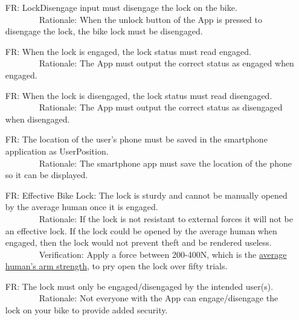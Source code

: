 \documentclass[12pt]{article}
\newcounter{reqnum} %
\begin{document}
\begin{itemize}
\setlength{\itemindent}{.5in}
\item[FR\refstepcounter{reqnum}\thereqnum\label{FRDisengage}:] LockDisengage input must disengage the lock on the bike.
\\ \-\ \-\ \-\ \-\ \-\ \-\ \-\ \-\ Rationale: When the unlock button of the App is pressed to disengage the lock, the bike lock must be disengaged.
\item[FR\refstepcounter{reqnum}\thereqnum\label{FRLockStatusEngaged}:] When the lock is engaged, the lock status must read engaged.
\\ \-\ \-\ \-\ \-\ \-\ \-\ \-\ \-\ Rationale: The App must output the correct status as engaged when engaged.
\item[FR\refstepcounter{reqnum}\thereqnum\label{FRLockStatusDisengaged}:] When the lock is disengaged, the lock status must read disengaged.
\\ \-\ \-\ \-\ \-\ \-\ \-\ \-\ \-\ Rationale: The App must output the correct status as disengaged when disengaged.
\item[FR\refstepcounter{reqnum}\thereqnum\label{FRUserPos}:] The location of the user’s phone must be saved in the smartphone application as UserPosition.
\\ \-\ \-\ \-\ \-\ \-\ \-\ \-\ \-\ Rationale: The smartphone app must save the location of the phone so it can be displayed.
\item[FR\refstepcounter{reqnum}\thereqnum\label{FRSturdy}:] Effective Bike Lock: The lock is sturdy and cannot be manually opened by the average human once it is engaged.
\\ \-\ \-\ \-\ \-\ \-\ \-\ \-\ \-\ Rationale: If the lock is not resistant to external forces it will not be an effective lock. If the lock could be opened by the average human when engaged, then the lock would not prevent theft and be rendered useless.
\\ \-\ \-\ \-\ \-\ \-\ \-\ \-\ \-\ Verification: Apply a force between 200-400N, which is the \href{https://www.tandfonline.com/doi/pdf/10.1080/10803548.2004.11076594?cookieSet=1}{average human's arm strength}, to pry open the lock over fifty trials. 
\item[FR\refstepcounter{reqnum}\thereqnum\label{FRCorrectUser}:] The lock must only be engaged/disengaged by the intended user(s).
\\ \-\ \-\ \-\ \-\ \-\ \-\ \-\ \-\ Rationale: Not everyone with the App can engage/disengage the lock on your bike to provide added security.
\end{itemize}
\end{document}
